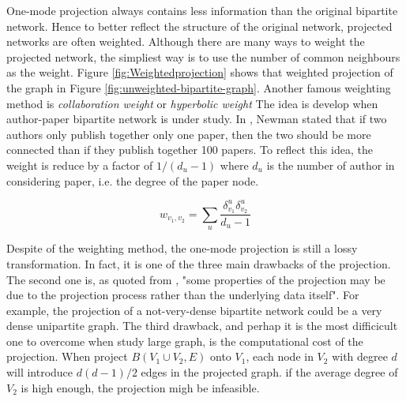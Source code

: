 One-mode projection always contains less information than the original bipartite network.
Hence to better reflect the structure of the original network,
projected networks are often weighted.
Although there are many ways to weight the projected network,
the simpliest way is to use the number of common neighbours as the weight.
Figure \ref{fig:Weightedprojection} shows that weighted projection of the graph in Figure \ref{fig:unweighted-bipartite-graph}.
Another famous weighting method is \textit{collaboration weight} or \textit{hyperbolic weight}
The idea is develop when author-paper bipartite network is under study.
In \cite{newman2001}, Newman stated that if two authors only publish together only one paper,
then the two should be more connected than if they publish together 100 papers.
To reflect this idea, the weight is reduce by a factor of $1/(d_u-1)$
where $d_u$ is the number of author in considering paper, i.e. the degree of the paper node.

\begin{equation*}
	w_{v_1, v_2} = \sum_u \frac{\delta^u_{v_1}\delta^u_{v_2}}{d_u - 1}
\end{equation*}

Despite of the weighting method, the one-mode projection is still a lossy transformation.
In fact, it is one of the three main drawbacks of the projection.
The second one is, as quoted from \cite{latapy2006},
"some properties of the projection may be due to the projection process rather than the underlying data itself".
For example, the projection of a not-very-dense bipartite network could be a very dense unipartite graph.
The third drawback, and perhap it is the most difficicult one to overcome when study large graph,
is the computational cost of the projection.
When project $B(V_1 \cup V_2, E)$ onto $V_1$,
each node in $V_2$ with degree $d$ will introduce $d(d-1)/2$ edges in the projected graph.
if the average degree of $V_2$ is high enough, the projection migh be infeasible.

